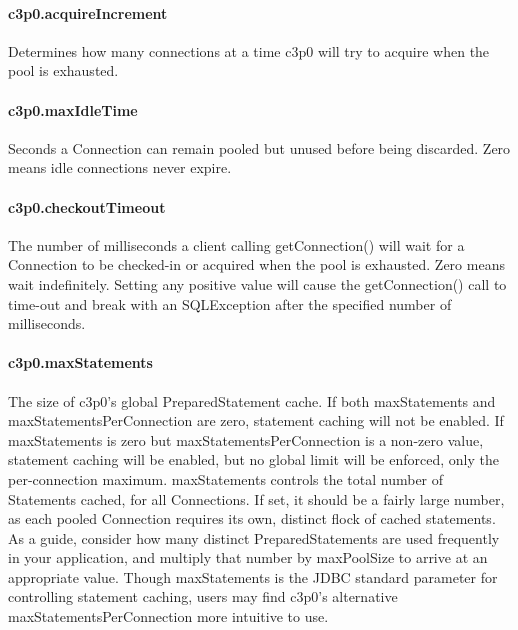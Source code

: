 \documentclass[12pt,a4paper]{report}
\begin{document}
\paragraph{c3p0.acquireIncrement}
Determines how many connections at a time c3p0 will try to acquire when the pool
is exhausted.

\paragraph{c3p0.maxIdleTime}
Seconds a Connection can remain pooled but unused before being discarded. Zero
means idle connections never expire.

\paragraph{c3p0.checkoutTimeout}
The number of milliseconds a client calling getConnection() will wait for a Connection
to be checked-in or acquired when the pool is exhausted. Zero means wait indefinitely.
Setting any positive value will cause the getConnection() call to time-out and
break with an SQLException after the specified number of milliseconds.

\paragraph{c3p0.maxStatements}
The size of c3p0's global PreparedStatement cache. If both maxStatements and
maxStatementsPerConnection are zero, statement caching will not be enabled.
If maxStatements is zero but maxStatementsPerConnection is a non-zero value,
statement caching will be enabled, but no global limit will be enforced, only
the per-connection maximum. maxStatements controls the total number of Statements
cached, for all Connections. If set, it should be a fairly large number, as each
pooled Connection requires its own, distinct flock of cached statements. As a guide,
consider how many distinct PreparedStatements are used frequently in your application,
and multiply that number by maxPoolSize to arrive at an appropriate value. Though
maxStatements is the JDBC standard parameter for controlling statement caching,
users may find c3p0's alternative maxStatementsPerConnection more intuitive to use.
\end{document}
